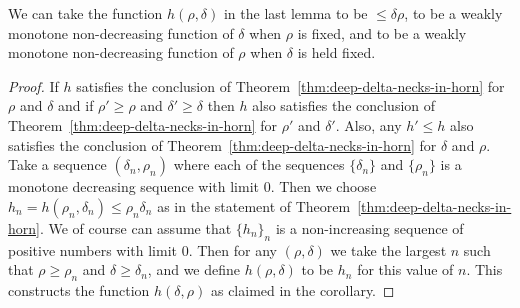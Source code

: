 \begin{corollary}
\label{cor:monotone-h-function}
\label{hmonotone}
We can take the function $h(\rho,\delta)$ in the last lemma to be
$\le \delta\rho$, to be a weakly monotone non-decreasing function of
$\delta$ when $\rho$ is fixed, and to be a weakly monotone
non-decreasing function of $\rho$ when $\delta$ is held fixed.
\end{corollary}


\begin{proof}
If $h$ satisfies the conclusion of Theorem~\ref{thm:deep-delta-necks-in-horn} for $\rho$
and $\delta$ and if $\rho'\ge \rho$ and $\delta'\ge \delta$ then $h$
also satisfies the conclusion of Theorem~\ref{thm:deep-delta-necks-in-horn} for $\rho'$
and $\delta'$. Also, any $h'\le h$ also satisfies the conclusion of
Theorem~\ref{thm:deep-delta-necks-in-horn} for $\delta$ and $\rho$. Take a sequence
$(\delta_n,\rho_n)$ where each of the sequences $\{\delta_n\}$ and
$\{\rho_n\}$ is a monotone decreasing sequence with limit $0$. Then
we choose $h_n=h(\rho_n,\delta_n)\le \rho_n\delta_n$ as in the
statement of Theorem~\ref{thm:deep-delta-necks-in-horn}. We of course can assume that
$\{h_n\}_n$ is a non-increasing sequence of positive numbers with
limit $0$. Then for any $(\rho,\delta)$ we take the largest $n$ such
that $\rho\ge \rho_n$ and $\delta\ge \delta_n$, and we define
$h(\rho,\delta)$ to be $h_n$ for this value of $n$. This constructs
the function $h(\delta,\rho)$ as claimed in the corollary.
\end{proof}
